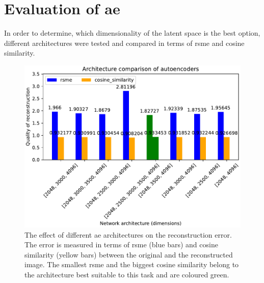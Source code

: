 \section{Evaluation of \ac{ae}}\label{sec:evaluation-ae}

In order to determine, which dimensionality of the latent space is the best option, 
different architectures were tested and compared in terms of \ac{rsme} and cosine similarity.



\begin{figure}[h] %
    \centering
    \includegraphics[width=1.0\textwidth]{images/embeddings/autoencoder/ae_score_plot.pdf}
    \caption{The effect of different \ac{ae} architectures on the reconstruction error.
    The error is measured in terms of \ac{rsme} (blue bars) and cosine similarity (yellow bars) between the original and the reconstructed image.
    The smallest \ac{rsme} and the biggest cosine similarity belong to the architecture best suitable to this task and are coloured green.
    }
    \label{fig:eval-ae}
\end{figure}